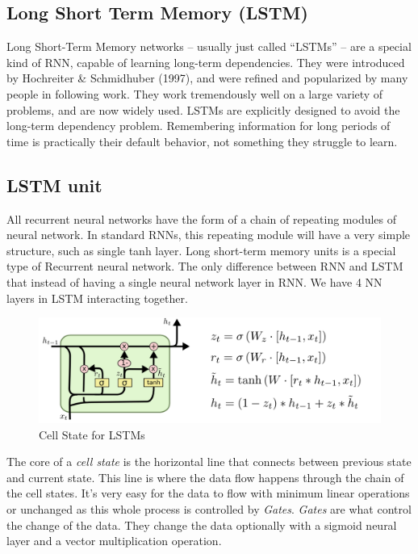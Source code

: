 \subsection{Long Short Term Memory (LSTM)}

Long Short-Term Memory networks – usually just called “LSTMs” – are a special kind of RNN, capable of learning long-term dependencies. They were introduced by Hochreiter & Schmidhuber (1997), and were refined and popularized by many people in following work. They work tremendously well on a large variety of problems, and are now widely used.
LSTMs are explicitly designed to avoid the long-term dependency problem. Remembering information for long periods of time is practically their default behavior, not something they struggle to learn. 

\subsection{LSTM unit}

All recurrent neural networks have the form of a chain of repeating modules of neural network. In standard RNNs, this repeating module will have a very simple structure, such as single tanh layer.
Long short-term memory units is a special type of Recurrent neural network.
The only difference between RNN and LSTM that instead of having a single neural network layer in RNN. We have 4 NN layers in LSTM interacting together.

\vspace{1cm}

\begin{figure}[ht]
    \centering
    \includegraphics[scale=0.4]{Images/LSTM3-var-GRU.png}
    \caption{Cell State for LSTMs}
    \label{fig:lstm}
\end{figure}

\vspace{1cm}



The core of a \textit{cell state} is the horizontal line that connects between previous state and current state. This line is where the data flow happens through the chain of the cell states. It’s very easy for the data to flow with minimum linear operations or unchanged as this whole process is controlled by \textit{Gates}.
\textit{Gates} are what control the change of the data. They change the data optionally with a sigmoid neural layer and a vector multiplication operation.

